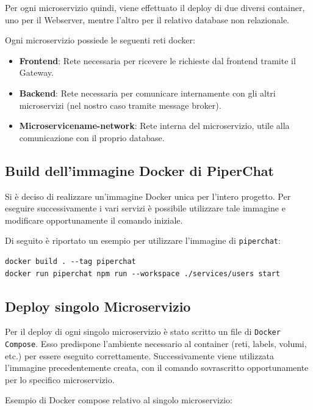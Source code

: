 Per ogni microservizio quindi, viene effettuato il deploy di due diversi container, uno per il Webserver, mentre l'altro per il relativo database non relazionale.

Ogni microservizio possiede le seguenti reti docker:

\begin{itemize}
    \item \textbf{Frontend}: Rete necessaria per ricevere le richieste dal frontend tramite il Gateway.

    \item \textbf{Backend}: Rete necessaria per comunicare internamente con gli altri microservizi (nel nostro caso tramite message broker).

    \item \textbf{Microservicename-network}: Rete interna del microservizio, utile alla comunicazione con il proprio database.
\end{itemize}

%
%
%
\subsection{Build dell'immagine Docker di PiperChat}

Si è deciso di realizzare un'immagine Docker unica per l'intero progetto.
%
Per eseguire successivamente i vari servizi è possibile utilizzare tale immagine e modificare opportunamente il comando iniziale.

Di seguito è riportato un esempio per utilizzare l'immagine di \texttt{piperchat}:

\begin{verbatim}
docker build . --tag piperchat
docker run piperchat npm run --workspace ./services/users start
\end{verbatim}

%
%
%
\subsection{Deploy singolo Microservizio}

Per il deploy di ogni singolo microservizio è stato scritto un file di \texttt{Docker Compose}.
%
Esso predispone l'ambiente necessario al container (reti, labels, volumi, etc.) per essere eseguito correttamente.
%
Successivamente viene utilizzata l'immagine precedentemente creata, con il comando sovrascritto opportunamente per lo specifico microservizio.

Esempio di Docker compose relativo al singolo microservizio:

